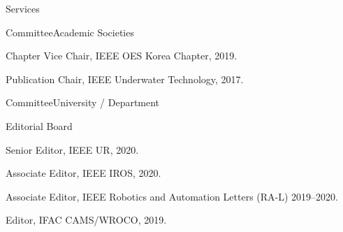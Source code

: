 \begin{rSection}{Services}

\begin{rSubsection}{Committee}{}{Academic Societies}{}

  \item Chapter Vice Chair, IEEE OES Korea Chapter, 2019.


  \item Publication Chair, IEEE Underwater Technology, 2017.

\end{rSubsection}

\begin{rSubsection}{Committee}{}{University / Department}{}


\end{rSubsection}

%

\begin{rSubsection}{Editorial Board}{}{}{}
  \item Senior Editor, IEEE UR, 2020.
  \item Associate Editor, IEEE IROS, 2020.
  \item Associate Editor, IEEE Robotics and Automation Letters (RA-L) 2019--2020.
  \item Editor, IFAC CAMS/WROCO, 2019.
\end{rSubsection}


\end{rSection}
